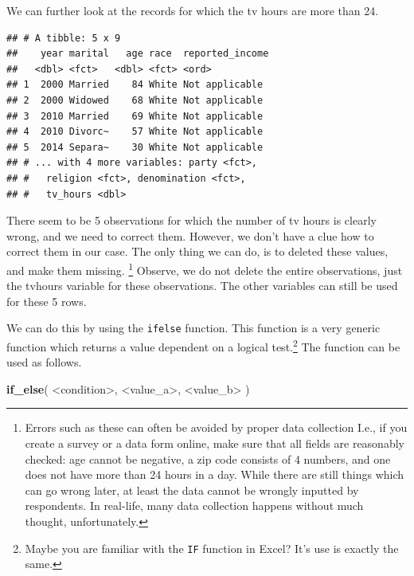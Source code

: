 \documentclass[]{tufte-book}
\newenvironment{Shaded}{}{}
\newcommand{\KeywordTok}[1]{\textcolor[rgb]{0.00,0.44,0.13}{\textbf{#1}}}
\newcommand{\DecValTok}[1]{\textcolor[rgb]{0.25,0.63,0.44}{#1}}
\newcommand{\StringTok}[1]{\textcolor[rgb]{0.25,0.44,0.63}{#1}}
\newcommand{\OperatorTok}[1]{\textcolor[rgb]{0.40,0.40,0.40}{#1}}
\newcommand{\NormalTok}[1]{#1}
\begin{document}
We can further look at the records for which the tv hours are more than
24.

\begin{Shaded}
\end{Shaded}

\begin{verbatim}
## # A tibble: 5 x 9
##    year marital   age race  reported_income
##   <dbl> <fct>   <dbl> <fct> <ord>          
## 1  2000 Married    84 White Not applicable 
## 2  2000 Widowed    68 White Not applicable 
## 3  2010 Married    69 White Not applicable 
## 4  2010 Divorc~    57 White Not applicable 
## 5  2014 Separa~    30 White Not applicable 
## # ... with 4 more variables: party <fct>,
## #   religion <fct>, denomination <fct>,
## #   tv_hours <dbl>
\end{verbatim}

There seem to be 5 observations for which the number of tv hours is
clearly wrong, and we need to correct them. However, we don't have a
clue how to correct them in our case. The only thing we can do, is to
deleted these values, and make them missing. \footnote{Errors such as
  these can often be avoided by proper data collection I.e., if you
  create a survey or a data form online, make sure that all fields are
  reasonably checked: age cannot be negative, a zip code consists of 4
  numbers, and one does not have more than 24 hours in a day. While
  there are still things which can go wrong later, at least the data
  cannot be wrongly inputted by respondents. In real-life, many data
  collection happens without much thought, unfortunately.} Observe, we
do not delete the entire observations, just the tvhours variable for
these observations. The other variables can still be used for these 5
rows.

We can do this by using the \texttt{ifelse} function. This function is a
very generic function which returns a value dependent on a logical
test.\footnote{Maybe you are familiar with the \texttt{IF} function in
  Excel? It's use is exactly the same.} The function can be used as
follows.

\begin{Shaded}
\begin{Highlighting}[]
\KeywordTok{if_else}\NormalTok{( }\OperatorTok{<}\NormalTok{condition}\OperatorTok{>}\NormalTok{, }\OperatorTok{<}\NormalTok{value_a}\OperatorTok{>}\NormalTok{, }\OperatorTok{<}\NormalTok{value_b}\OperatorTok{>}\StringTok{ }\NormalTok{)}
\end{Highlighting}
\end{Shaded}
\end{document}
